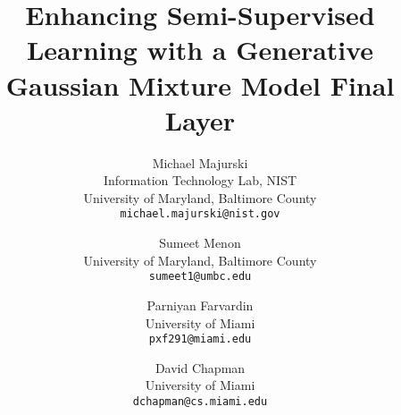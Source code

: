 \documentclass[10pt,twocolumn,letterpaper]{article}
\begin{document}
	
	\title{Enhancing Semi-Supervised Learning with a Generative Gaussian Mixture Model Final Layer}
	
	\author{Michael Majurski\\
		Information Technology Lab, NIST\\
		University of Maryland, Baltimore County\\
		{\tt\small michael.majurski@nist.gov}
	\and
	Sumeet Menon\\
	University of Maryland, Baltimore County\\
	{\tt\small sumeet1@umbc.edu}
	\and
	Parniyan Farvardin\\
	University of Miami\\
	{\tt\small pxf291@miami.edu}
	\and
	David Chapman\\
	University of Miami\\
	{\tt\small dchapman@cs.miami.edu}
}

\maketitle
\end{document}
